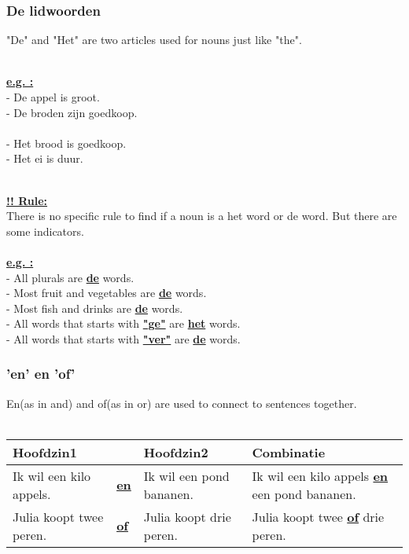 \documentclass[a4paper,14pt]{extarticle}
\newcommand{\attention}[1]{\underline{\textbf{!! #1}}}
\newcommand{\emp}[1]{\underline{\textbf{#1}}}
\begin{document}
\subsubsection{De lidwoorden}
"De" and "Het" are two articles used for nouns just like "the".
\begin{paracol}{2}
\hfill \\
\emp{e.g. : } \\
- De appel is groot. \\
- De broden zijn goedkoop.
\switchcolumn
\hfill \\ \\
- Het brood is goedkoop. \\
- Het ei is duur.
\end{paracol}
\hfill \\
\attention{Rule:} \\
There is no specific rule to find if a noun is a het word or de word. But there are some indicators. \\ \\
\emp{e.g. : } \\
- All plurals are \emp{de} words. \\
- Most fruit and vegetables are \emp{de} words. \\
- Most fish and drinks are \emp{de} words. \\
- All words that starts with \emp{"ge"} are \emp{het} words. \\
- All words that starts with \emp{"ver"} are \emp{de} words. 
\subsubsection{'en' en 'of'}
En(as in and) and of(as in or) are used to connect to sentences together.\\ \\
\begin{tabularx}{\textwidth}{ p{} p{} p{} p{} }
 \hline
 Hoofdzin1 &  & Hoofdzin2 & Combinatie\\
 \hline
 Ik wil een kilo appels. & \emp{en} & Ik wil een pond bananen. & Ik wil een kilo appels \emp{en} een pond bananen. \\
 Julia koopt twee peren. & \emp{of} & Julia koopt drie peren. & Julia koopt twee \emp{of} drie peren. \\
\end{tabularx}
\end{document}
